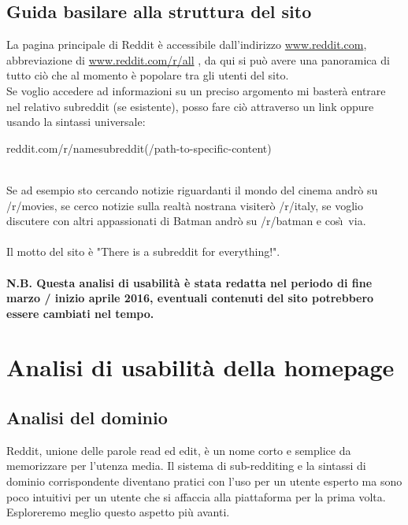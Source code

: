 \documentclass[12pt]{article}
\begin{document}
\subsection{Guida basilare alla struttura del sito}
La pagina principale di Reddit \`e accessibile dall'indirizzo \url{www.reddit.com}, abbreviazione di \url{www.reddit.com/r/all} , da qui si pu\`o avere una panoramica di tutto ci\`o che al momento \`e popolare tra gli utenti del sito.\\
Se voglio accedere ad informazioni su un preciso argomento mi baster\`a entrare nel relativo subreddit (se esistente), posso fare ci\`o attraverso un link oppure usando la sintassi universale:\\ \centerline{reddit.com/r/namesubreddit(/path-to-specific-content)}\\ Se ad esempio sto cercando notizie riguardanti il mondo del cinema andr\`o su /r/movies, se cerco notizie sulla realt\`a nostrana visiter\`o /r/italy, se voglio discutere con altri appassionati di Batman andr\`o su /r/batman e cos\`\i\  via.\\ \\
Il motto del sito \`e "There is a subreddit for everything!".
\\ \\ \textbf{N.B. Questa analisi di usabilit\`a \`e stata redatta nel periodo di fine marzo / inizio aprile 2016, eventuali contenuti del sito potrebbero essere cambiati nel tempo.}

\newpage
\section{Analisi di usabilit\`a della homepage} %
\subsection{Analisi del dominio}
Reddit, unione delle parole read ed edit, \`e un nome corto e semplice da memorizzare per l'utenza media.
Il sistema di sub-redditing e la sintassi di dominio corrispondente diventano pratici con l'uso per un utente esperto ma sono poco intuitivi per un utente che si affaccia alla piattaforma per la prima volta. Esploreremo meglio questo aspetto pi\`u avanti.
\end{document}
